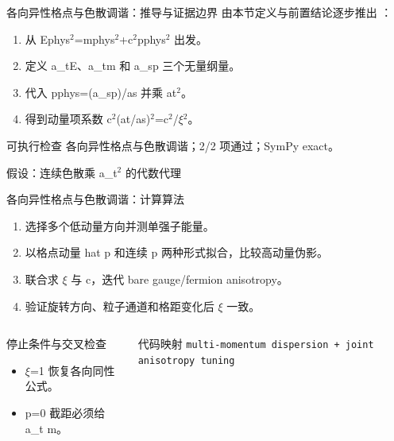 \begin{frame}[t]{各向异性格点与色散调谐：推导与证据边界}
\footnotesize
{}\quad 由本节定义与前置结论逐步推出 ：
\begin{enumerate}
\item 从 Ephys\ensuremath{^{2}}=mphys\ensuremath{^{2}}+c\ensuremath{^{2}}pphys\ensuremath{^{2}} 出发。
\item 定义 a\_tE、a\_tm 和 a\_sp 三个无量纲量。
\item 代入 pphys=(a\_sp)/\allowbreak{}as 并乘 at\ensuremath{^{2}}。
\item 得到动量项系数 c\ensuremath{^{2}}(at/\allowbreak{}as)\ensuremath{^{2}}=c\ensuremath{^{2}}/\allowbreak{}\ensuremath{\xi}\ensuremath{^{2}}。
\end{enumerate}\begin{block}{可执行检查}
\quad 各向异性格点与色散调谐；2/2 项通过；SymPy exact。
\par\scriptsize 假设：连续色散乘 a\_t\ensuremath{^{2}} 的代数代理
\end{block}
\end{frame}

\begin{frame}[t]{各向异性格点与色散调谐：计算算法}
\footnotesize
{}\begin{enumerate}
\item 选择多个低动量方向并测单强子能量。
\item 以格点动量 hat p 和连续 p 两种形式拟合，比较高动量伪影。
\item 联合求 \ensuremath{\xi} 与 c，迭代 bare gauge/\allowbreak{}fermion anisotropy。
\item 验证旋转方向、粒子通道和格距变化后 \ensuremath{\xi} 一致。
\end{enumerate}\begin{columns}[T,onlytextwidth]
\begin{block}{停止条件与交叉检查}\scriptsize\begin{itemize}
\item[\CheckMark] \ensuremath{\xi}=1 恢复各向同性公式。
\item[\CheckMark] p=0 截距必须给 a\_t m。
\end{itemize}\end{block}
\begin{block}{代码映射}
\scriptsize \texttt{multi-momentum dispersion + joint anisotropy tuning}
\end{block}\end{columns}\end{frame}

